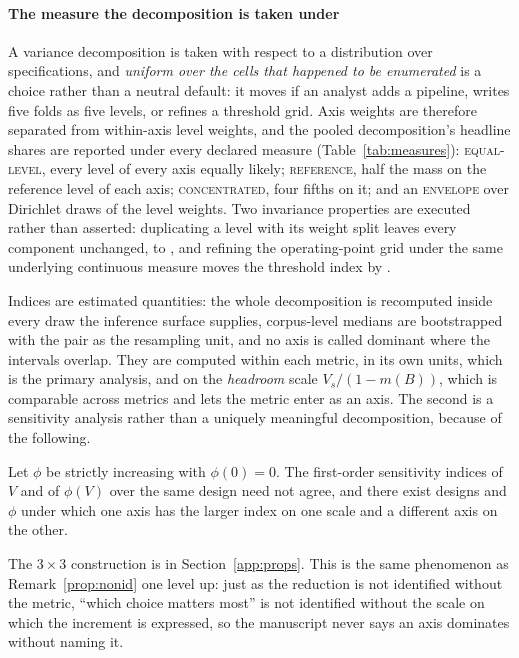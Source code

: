 \paragraph{The measure the decomposition is taken under}
A variance decomposition is taken with respect to a distribution over
specifications, and \emph{uniform over the cells that happened to be enumerated} is a
choice rather than a neutral default: it moves if an analyst adds a pipeline,
writes five folds as five levels, or refines a threshold grid. Axis weights
are therefore separated from within-axis level weights, and the pooled
decomposition's headline shares are reported under every declared measure
(Table~\ref{tab:measures}):
\textsc{equal-level}, every level of every axis equally likely;
\textsc{reference}, half the mass on the reference level of each axis;
\textsc{concentrated}, four fifths on it; and an \textsc{envelope} over
Dirichlet draws of the level weights. Two invariance properties are executed
rather than asserted: duplicating a level with its weight split leaves every
component unchanged, to \invarianceDuplicateShift, and refining the
operating-point grid under the same underlying continuous measure moves the
threshold index by \invarianceGridShift.

Indices are estimated quantities: the whole decomposition is recomputed inside
every draw the inference surface supplies, corpus-level medians are
bootstrapped with the pair as the resampling unit, and no axis is called
dominant where the intervals overlap. They are computed within each
metric, in its own units, which is the primary analysis, and on the
\emph{headroom} scale $V_s / (1 - m(B))$, which is comparable across
metrics and lets the metric enter as an axis. The second is a sensitivity
analysis rather than a uniquely meaningful decomposition, because of the
following.

\begin{proposition}
\label{prop:scale}
Let $\phi$ be strictly increasing with $\phi(0) = 0$. The first-order
sensitivity indices of $V$ and of $\phi(V)$ over the same design need not
agree, and there exist designs and $\phi$ under which one axis has the larger
index on one scale and a different axis on the other.
\end{proposition}

\noindent The $3\times 3$ construction is in Section~\ref{app:props}. This
is the same phenomenon as Remark~\ref{prop:nonid} one level up: just as
the reduction is not identified without the metric, ``which choice matters
most'' is not identified without the scale on which the increment is
expressed, so the manuscript never says an axis dominates without naming it.

